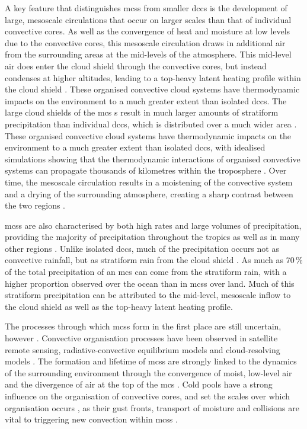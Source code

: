 A key feature that distinguishes \acrshort{mcs}s from smaller \acrshort{dcc}s is the development of large, mesoscale circulations that occur on larger scales than that of individual convective cores.
As well as the convergence of heat and moisture at low levels due to the convective cores, this mesoscale circulation draws in additional air from the surrounding areas at the mid-levels of the atmosphere.
This mid-level air does enter the cloud shield through the convective cores, but instead condenses at higher altitudes, leading to a top-heavy latent heating profile within the cloud shield \citep{schumacher_tropical_2004}.
These organised convective cloud systems have thermodynamic impacts on the environment to a much greater extent than isolated \acrshort{dcc}s.
The large cloud shields of the \acrshort{mcs} s result in much larger amounts of stratiform precipitation than individual \acrshort{dcc}s, which is distributed over a much wider area \citep{houze_chapter_2014}.
These organised convective cloud systems have thermodynamic impacts on the environment to a much greater extent than isolated \acrshort{dcc}s, with idealised simulations showing that the thermodynamic interactions of organised convective systems can propagate thousands of kilometres within the troposphere \citep{beucler_budget_2019}.
Over time, the mesoscale circulation results in a moistening of the convective system and a drying of the surrounding atmosphere, creating a sharp contrast between the two regions \citep{bretherton_energybalance_2005}.

\acrshort{mcs}s are also characterised by both high rates and large volumes of precipitation, providing the majority of precipitation throughout the tropics as well as in many other regions \citep{feng_global_2021}.
Unlike isolated \acrshort{dcc}s, much of the precipitation occurs not as convective rainfall, but as stratiform rain from the cloud shield \citep{schumacher_stratiform_2003}.
As much as 70\,\% of the total precipitation of an \acrshort{mcs} can come from the stratiform rain, with a higher proportion observed over the ocean than in \acrshort{mcs}s over land.
Much of this stratiform precipitation can be attributed to the mid-level, mesoscale inflow to the cloud shield as well as the top-heavy latent heating profile.

The processes through which \acrshort{mcs}s form in the first place are still uncertain, however \citep{houze_100_2018}.
Convective organisation processes have been observed in satellite remote sensing, radiative-convective equilibrium models and cloud-resolving models \citep{holloway_observing_2017}. 
The formation and lifetime of \acrshort{mcs}s are strongly linked to the dynamics of the surrounding environment through the convergence of moist, low-level air and the divergence of air at the top of the \acrshort{mcs}  \citep{houze_chapter_2014}. 
Cold pools have a strong influence on the organisation of convective cores, and set the scales over which organisation occurs \citep{jeevanjee_convective_2013}, as their gust fronts, transport of moisture and collisions are vital to triggering new convection within \acrshort{mcs}s \citep{feng_mechanisms_2015}.

